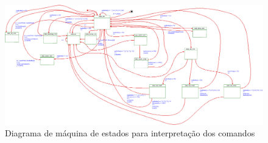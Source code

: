 \documentclass{article}
\begin{document}
\begin{figure}[H]
	\centering
	\includegraphics[width=1.5\linewidth, center]{estados}
	\caption{Diagrama de máquina de estados para interpretação dos comandos}
	\label{fig:estados}
\end{figure}
\end{document}
